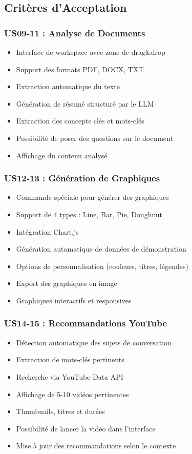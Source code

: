 \subsection{Critères d'Acceptation}

\subsubsection{US09-11 : Analyse de Documents}

\begin{itemize}
    \item Interface de workspace avec zone de drag\&drop
    \item Support des formats PDF, DOCX, TXT
    \item Extraction automatique du texte
    \item Génération de résumé structuré par le LLM
    \item Extraction des concepts clés et mots-clés
    \item Possibilité de poser des questions sur le document
    \item Affichage du contenu analysé
\end{itemize}

\subsubsection{US12-13 : Génération de Graphiques}

\begin{itemize}
    \item Commande spéciale pour générer des graphiques
    \item Support de 4 types : Line, Bar, Pie, Doughnut
    \item Intégration Chart.js
    \item Génération automatique de données de démonstration
    \item Options de personnalisation (couleurs, titres, légendes)
    \item Export des graphiques en image
    \item Graphiques interactifs et responsives
\end{itemize}

\subsubsection{US14-15 : Recommandations YouTube}

\begin{itemize}
    \item Détection automatique des sujets de conversation
    \item Extraction de mots-clés pertinents
    \item Recherche via YouTube Data API
    \item Affichage de 5-10 vidéos pertinentes
    \item Thumbnails, titres et durées
    \item Possibilité de lancer la vidéo dans l'interface
    \item Mise à jour des recommandations selon le contexte
\end{itemize}

